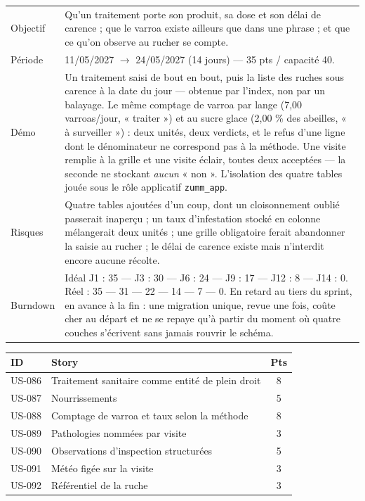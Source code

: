 \begin{center}
\begin{tabular}{lp{11cm}}
\toprule
Objectif  & Qu'un traitement porte son produit, sa dose et son délai de carence ;
            que le varroa existe ailleurs que dans une phrase ; et que ce qu'on
            observe au rucher se compte. \\
Période   & 11/05/2027 $\rightarrow$ 24/05/2027 (14 jours) --- 35 pts / capacité 40. \\
Démo      & Un traitement saisi de bout en bout, puis la liste des ruches sous
            carence à la date du jour --- obtenue par l'index, non par un
            balayage. Le même comptage de varroa par lange (7,00 varroas/jour,
            « traiter ») et au sucre glace (2,00 \% des abeilles, « à
            surveiller ») : deux unités, deux verdicts, et le refus d'une ligne
            dont le dénominateur ne correspond pas à la méthode. Une visite
            remplie à la grille et une visite éclair, toutes deux acceptées ---
            la seconde ne stockant \emph{aucun} « non ». L'isolation des quatre
            tables jouée sous le rôle applicatif \texttt{zumm\_app}. \\
Risques   & Quatre tables ajoutées d'un coup, dont un cloisonnement oublié
            passerait inaperçu ; un taux d'infestation stocké en colonne
            mélangerait deux unités ; une grille obligatoire ferait abandonner la
            saisie au rucher ; le délai de carence existe mais n'interdit encore
            aucune récolte. \\
Burndown  & Idéal J1 : 35 --- J3 : 30 --- J6 : 24 --- J9 : 17 --- J12 : 8 ---
            J14 : 0. Réel : 35 --- 31 --- 22 --- 14 --- 7 --- 0. En retard au
            tiers du sprint, en avance à la fin : une migration unique, revue une
            fois, coûte cher au départ et ne se repaye qu'à partir du moment où
            quatre couches s'écrivent sans jamais rouvrir le schéma. \\
\bottomrule
\end{tabular}
\end{center}

\begin{center}
\begin{tabular}{lp{9cm}c}
\toprule
\textbf{ID} & \textbf{Story} & \textbf{Pts} \\
\midrule
US-086 & Traitement sanitaire comme entité de plein droit  & 8 \\
US-087 & Nourrissements                                    & 5 \\
US-088 & Comptage de varroa et taux selon la méthode       & 8 \\
US-089 & Pathologies nommées par visite                    & 3 \\
US-090 & Observations d'inspection structurées             & 5 \\
US-091 & Météo figée sur la visite                         & 3 \\
US-092 & Référentiel de la ruche                           & 3 \\
\bottomrule
\end{tabular}
\end{center}

